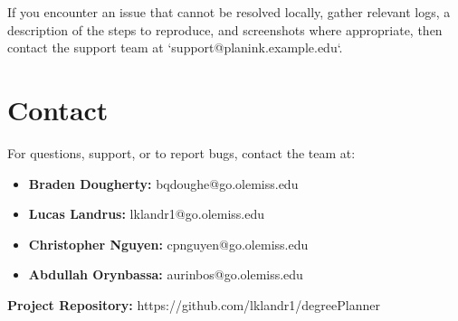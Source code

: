 \documentclass[12pt,letterpaper]{article}
\begin{document}
If you encounter an issue that cannot be resolved locally, gather relevant logs, a description of the steps to reproduce, and screenshots where appropriate, then contact the support team at `support@planink.example.edu`.

\newpage

\section{Contact}

For questions, support, or to report bugs, contact the team at:

\begin{itemize}
    \item \textbf{Braden Dougherty:} bqdoughe@go.olemiss.edu
    \item \textbf{Lucas Landrus:} lklandr1@go.olemiss.edu
    \item \textbf{Christopher Nguyen:} cpnguyen@go.olemiss.edu
    \item \textbf{Abdullah Orynbassa:} aurinbos@go.olemiss.edu

    



\end{itemize}

\textbf{Project Repository:} https://github.com/lklandr1/degreePlanner
\end{document}
